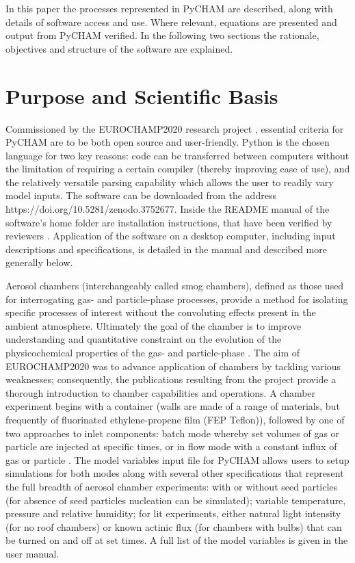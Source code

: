 \documentclass[gmd, manuscript]{copernicus}
\begin{document}
In this paper the processes represented in PyCHAM are described, along with details of software access and use.  Where relevant, equations are presented and output from PyCHAM verified.  In the following two sections the rationale, objectives and structure of the software are explained.

\section{Purpose and Scientific Basis}

Commissioned by the EUROCHAMP2020 research project \citep{EUROCHAMP2020}, essential criteria for PyCHAM are to be both open source and user-friendly.  Python is the chosen language for two key reasons: code can be transferred between computers without the limitation of requiring a certain compiler (thereby improving ease of use), and the relatively versatile parsing capability which allows the user to readily vary model inputs.  The software can be downloaded from the address https://doi.org/10.5281/zenodo.3752677.  Inside the README manual of the software's home folder are installation instructions, that have been verified by reviewers \citep{OMeara2020}.  Application of the software on a desktop computer, including input descriptions and specifications, is detailed in the manual and described more generally below.  

Aerosol chambers (interchangeably called smog chambers), defined as those used for interrogating gas- and particle-phase processes, provide a method for isolating specific processes of interest without the convoluting effects present in the ambient atmosphere.  Ultimately the goal of the chamber is to improve understanding and quantitative constraint on the evolution of the physicochemical properties of the gas- and particle-phase \citep{Schwantes2017, Charan2019, Hidy2019}.  The aim of EUROCHAMP2020 was to advance application of chambers by tackling various weaknesses; consequently, the publications \citep{EUROCHAMP2020} resulting from the project provide a thorough introduction to chamber capabilities and operations.  A chamber experiment begins with a container (walls are made of a range of materials, but frequently of fluorinated ethylene-propene film (FEP Teflon)), followed by one of two approaches to inlet components: batch mode whereby set volumes of gas or particle are injected at specific times, or in flow mode with a constant influx of gas or particle \citep{Jaoui2014}.  The model variables input file for PyCHAM allows users to setup simulations for both modes along with several other specifications that represent the full breadth of aerosol chamber experiments: with or without seed particles (for absence of seed particles nucleation can be simulated); variable temperature, pressure and relative humidity; for lit experiments, either natural light intensity (for no roof chambers) or known actinic flux (for chambers with bulbs) that can be turned on and off at set times.  A full list of the model variables is given in the user manual.
\end{document}
